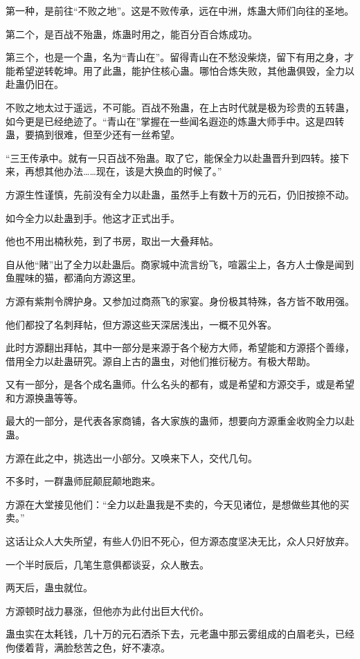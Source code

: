 \begin{this_body}
第一种，是前往“不败之地”。这是不败传承，远在中洲，炼蛊大师们向往的圣地。

第二个，是百战不殆蛊，炼蛊时用之，能百分百合炼成功。

第三个，也是一个蛊，名为“青山在”。留得青山在不愁没柴烧，留下有用之身，才能希望逆转乾坤。用了此蛊，能护住核心蛊。哪怕合炼失败，其他蛊俱毁，全力以赴蛊仍旧在。

不败之地太过于遥远，不可能。百战不殆蛊，在上古时代就是极为珍贵的五转蛊，如今更是已经绝迹了。“青山在”掌握在一些闻名遐迩的炼蛊大师手中。这是四转蛊，要搞到很难，但至少还有一丝希望。

“三王传承中。就有一只百战不殆蛊。取了它，能保全力以赴蛊晋升到四转。接下来，再想其他办法……现在，该是大换血的时候了。”

方源生性谨慎，先前没有全力以赴蛊，虽然手上有数十万的元石，仍旧按捺不动。

如今全力以赴蛊到手。他这才正式出手。

他也不用出楠秋苑，到了书房，取出一大叠拜帖。

自从他“赌”出了全力以赴蛊后。商家城中流言纷飞，喧嚣尘上，各方人士像是闻到鱼腥味的猫，都涌向方源这里。

方源有紫荆令牌护身。又参加过商燕飞的家宴。身份极其特殊，各方皆不敢用强。

他们都投了名刺拜帖，但方源这些天深居浅出，一概不见外客。

此时方源翻出拜帖，其中一部分是来源于各个秘方大师，希望能和方源搭个善缘，借用全力以赴蛊研究。源自上古的蛊虫，对他们推衍秘方。有极大帮助。

又有一部分，是各个成名蛊师。什么名头的都有，或是希望和方源交手，或是希望和方源换蛊等等。

最大的一部分，是代表各家商铺，各大家族的蛊师，想要向方源重金收购全力以赴蛊。

方源在此之中，挑选出一小部分。又唤来下人，交代几句。

不多时，一群蛊师屁颠屁颠地跑来。

方源在大堂接见他们：“全力以赴蛊我是不卖的，今天见诸位，是想做些其他的买卖。”

这话让众人大失所望，有些人仍旧不死心，但方源态度坚决无比，众人只好放弃。

一个半时辰后，几笔生意俱都谈妥，众人散去。

两天后，蛊虫就位。

方源顿时战力暴涨，但他亦为此付出巨大代价。

蛊虫实在太耗钱，几十万的元石洒杀下去，元老蛊中那云雾组成的白眉老头，已经佝偻着背，满脸愁苦之色，好不凄凉。


\end{this_body}
